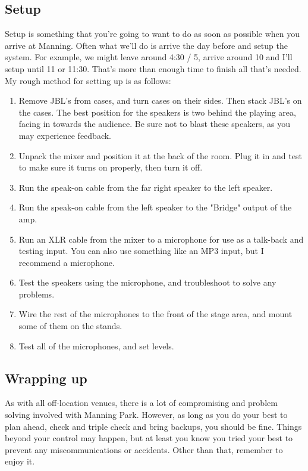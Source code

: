 \documentclass[letterpaper,10pt,oneside,headsepline]{scrreprt}
\begin{document}
\subsection{Setup} 
Setup is something that you're going to want to do as soon as possible when you arrive at Manning. Often what we'll do is arrive the day before and setup the system. For example, we might leave around 4:30 / 5, arrive around 10 and I'll setup until 11 or 11:30. That's more than enough time to finish all that's needed. My rough method for setting up is as follows:
\begin{enumerate}
\item Remove JBL's from cases, and turn cases on their sides. Then stack JBL's on the cases. The best position for the speakers is two behind the playing area, facing in towards the audience. Be sure not to blast these speakers, as you may experience feedback.
\item Unpack the mixer and position it at the back of the room. Plug it in and test to make sure it turns on properly, then turn it off.
\item Run the speak-on cable from the far right speaker to the left speaker.
\item Run the speak-on cable from the left speaker to the "Bridge" output of the amp.
\item Run an XLR cable from the mixer to a microphone for use as a talk-back and testing input. You can also use something like an MP3 input, but I recommend a microphone.
\item Test the speakers using the microphone, and troubleshoot to solve any problems.
\item Wire the rest of the microphones to the front of the stage area, and mount some of them on the stands.
\item Test all of the microphones, and set levels.
\end{enumerate}

\subsection{Wrapping up}
As with all off-location venues, there is a lot of compromising and problem solving involved with Manning Park. However, as long as you do your best to plan ahead, check and triple check and bring backups, you should be fine. Things beyond your control may happen, but at least you know you tried your best to prevent any miscommunications or accidents. Other than that, remember to enjoy it.
\end{document}
